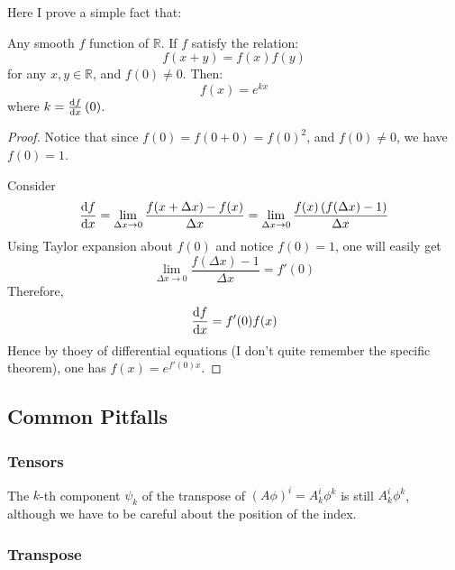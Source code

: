 Here I prove a simple fact that:
\begin{thm}
    Any smooth $f$ function of $\mathbb{R}$. If $f$ satisfy the
    relation:
    \begin{equation}
        f(x+y)=f(x)f(y)
    \end{equation}
    for any $x,y\in \mathbb{R}$, and $f(0)\neq 0$. Then:
    \begin{equation}
        f(x) = e^{k x}
    \end{equation}
    where $k=\dv{f}{x}\left(0\right)$.
\end{thm}
\begin{proof}
    Notice that since $f(0)=f(0+0)=f(0)^2$, and $f(0)\neq 0$, we have
    $f(0)=1$.

    Consider
    \begin{align*}
        \dv{f}{x} = \lim_{\Delta x\to 0} 
        \frac{f(x+\Delta x)-f(x)}{\Delta x}
            = \lim_{\Delta x\to 0} 
            \frac{f(x)\left(f(\Delta x)-1\right)}{\Delta x}
    \end{align*}
    Using Taylor expansion about $f(0)$ and notice $f(0)=1$, one will
    easily get
    \begin{equation*}
        \lim_{\Delta x\to 0} 
            \frac{f(\Delta x)-1}{\Delta x}
            = f'(0)
    \end{equation*}
    Therefore, 
    \begin{equation*}
        \dv{f}{x} = f'(0)f(x)
    \end{equation*}
    Hence by thoey of differential equations (I don't quite remember
    the specific theorem), one has $f(x)=e^{f'(0)x}$.
\end{proof}
    
\subsection{Common Pitfalls}
\label{sec:Common Pitfalls}
    \subsubsection{Tensors}
    \label{sec:Tensors}
    
    The $k$-th component $\psi_k$ of the transpose of $(A\phi)^i = A^i_k
    \phi^k$ is still $A^i_k \phi^k$, although we have to be careful about
    the position of the index.

    \subsubsection{Transpose}
    \label{sec:Transpose}
    
